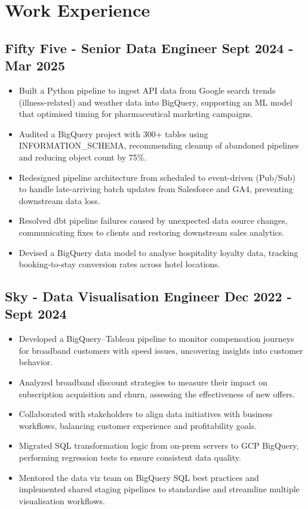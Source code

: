 \documentclass[a4paper, 10pt]{article}
\begin{document}
\vspace{-6.5mm}

\section*{Work Experience}

\subsection*{\textbf{Fifty Five - Senior Data Engineer} \hfill  Sept 2024 - Mar 2025}
\begin{itemize}[noitemsep]
    \item Built a Python pipeline to ingest API data from Google search trends (illness-related) and weather data into BigQuery, supporting an ML model that optimised timing for pharmaceutical marketing campaigns.
    \item Audited a BigQuery project with 300+ tables using INFORMATION\_SCHEMA, recommending cleanup of abandoned pipelines and reducing object count by 75\%.
    \item Redesigned pipeline architecture from scheduled to event-driven (Pub/Sub) to handle late-arriving batch updates from Salesforce and GA4, preventing downstream data loss.
    \item Resolved dbt pipeline failures caused by unexpected data source changes, communicating fixes to clients and restoring downstream sales analytics.
    \item Devised a BigQuery data model to analyse hospitality loyalty data, tracking booking-to-stay conversion rates across hotel locations.
\end{itemize}

\subsection*{\textbf{Sky - Data Visualisation Engineer} \hfill  Dec 2022 - Sept 2024}
\begin{itemize}[noitemsep]
    \item Developed a BigQuery–Tableau pipeline to monitor compensation journeys for broadband customers with speed issues, uncovering insights into customer behavior.
    \item Analyzed broadband discount strategies to measure their impact on subscription acquisition and churn, assessing the effectiveness of new offers.
    \item Collaborated with stakeholders to align data initiatives with business workflows, balancing customer experience and profitability goals.
    \item Migrated SQL transformation logic from on-prem servers to GCP BigQuery, performing regression tests to ensure consistent data quality.
    \item Mentored the data viz team on BigQuery SQL best practices and implemented shared staging pipelines to standardise and streamline multiple visualisation workflows.
\end{itemize}
\end{document}

